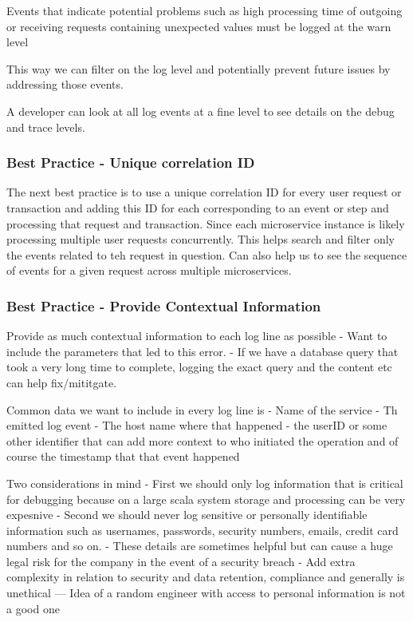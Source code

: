 \documentclass[a4paper, 11pt]{book}
\begin{document}
    Events that indicate potential problems such as high processing time of outgoing or receiving requests containing unexpected values must be logged at the warn level

    This way we can filter on the log level and potentially prevent future issues by addressing those events.

    A developer can look at all log events at a fine level to see details on the debug and trace levels.

    \subsubsection{Best Practice - Unique correlation ID}
    The next best practice is to use a unique correlation ID for every user request or transaction and adding this ID for each corresponding to an event or step and processing that request and transaction.
    Since each microservice instance is likely processing multiple user requests concurrently.
    This helps search and filter only the events related to teh request in question.
    Can also help us to see the sequence of events for a given request across multiple microservices.

    \subsubsection{Best Practice - Provide Contextual Information}
    Provide as much contextual information to each log line as possible
    - Want to include the parameters that led to this error.
    - If we have a database query that took a very long time to complete, logging the exact query and the content etc can help fix/mititgate.

    Common data we want to include in every log line is
    - Name of the service
    - Th emitted log event
    - The host name where that happened
    - the userID or some other identifier that can add more context to who initiated the operation and of course the timestamp that that event happened

    Two considerations in mind
    - First we should only log information that is critical for debugging because on a large scala system storage and processing can be very expesnive
    - Second we should never log sensitive or personally identifiable information such as usernames, passwords, security numbers, emails, credit card numbers and so on.
    - These details are sometimes helpful but can cause a huge legal risk for the company in the event of a security breach
    - Add extra complexity in relation to security and data retention, compliance and generally is unethical
    --- Idea of a random engineer with access to personal information is not a good one
\end{document}
